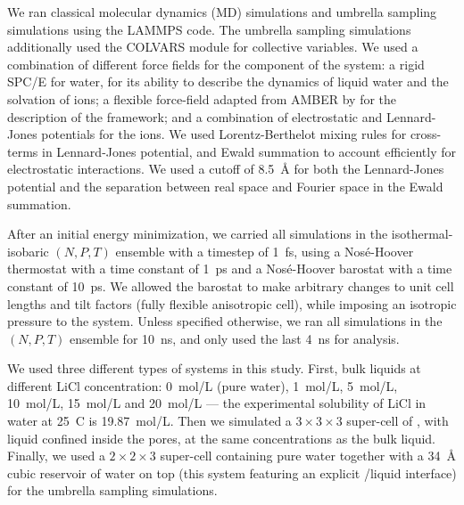 \documentclass[thesis]{subfiles}
\begin{document}
We ran classical molecular dynamics (MD) simulations and umbrella sampling
simulations using the LAMMPS\cite{Plimpton1993} code. The umbrella sampling
simulations additionally used the COLVARS\cite{Fiorin2013} module for collective
variables. We used a combination of different force fields for the component of
the system: a rigid SPC/E\cite{Berendsen1987} for water, for its ability to
describe the dynamics of liquid water and the solvation of ions; a flexible
force-field adapted from AMBER by \citeauthor{Zheng2012}\cite{Zheng2012} for the
description of the  framework; and a combination of electrostatic and
Lennard-Jones potentials for the ions\cite{Chowdhuri2003}. We used
Lorentz-Berthelot mixing rules for cross-terms in Lennard-Jones potential, and
Ewald summation to account efficiently for electrostatic interactions. We used a
cutoff of \SI{8.5}{\angstrom} for both the Lennard-Jones potential and the
separation between real space and Fourier space in the Ewald summation.

After an initial energy minimization, we carried all simulations in the
isothermal-isobaric $(N, P, T)$ ensemble with a timestep of \SI{1}{fs}, using a
Nosé-Hoover thermostat with a time constant of \SI{1}{ps} and a Nosé-Hoover
barostat with a time constant of \SI{10}{ps}. We allowed the barostat to make
arbitrary changes to unit cell lengths and tilt factors (fully flexible
anisotropic cell), while imposing an isotropic pressure to the system. Unless
specified otherwise, we ran all simulations in the $(N, P, T)$ ensemble for
\SI{10}{ns}, and only used the last \SI{4}{ns} for analysis.

We used three different types of systems in this study. First, bulk liquids at
different LiCl concentration: \SI{0}{mol/L} (pure water), \SI{1}{mol/L},
\SI{5}{mol/L}, \SI{10}{mol/L}, \SI{15}{mol/L} and \SI{20}{mol/L} --- the
experimental solubility of LiCl in water at 25~{\textdegree C} is
\SI{19.87}{mol/L}. Then we simulated a $3\times3\times3$ super-cell of ,
with liquid confined inside the pores, at the same concentrations as the bulk
liquid. Finally, we used a $2\times2\times3$  super-cell containing pure
water together with a \SI{34}{\angstrom} cubic reservoir of water on top (this
system featuring an explicit /liquid interface) for the umbrella sampling
simulations.
\end{document}
